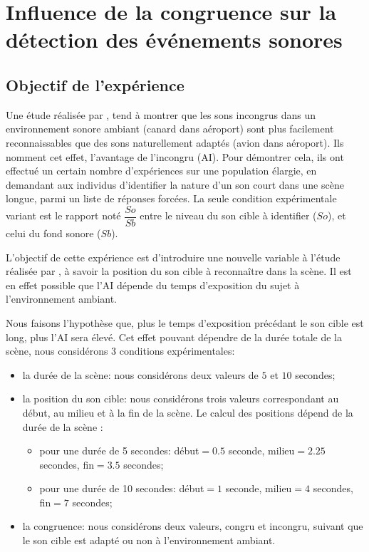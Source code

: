 \chapter[Expérience annexe: congruence]{Influence de la congruence sur la détection des événements sonores}
\label{app:xp_congruence}


\section{Objectif de l'expérience}

Une étude réalisée par \citep{gygi2011incongruency}, tend à montrer que les sons incongrus dans un environnement sonore ambiant (canard dans aéroport) sont plus facilement reconnaissables que des sons naturellement adaptés (avion dans aéroport). Ils nomment cet effet, l'avantage de l'incongru (AI). Pour démontrer cela, ils ont effectué un certain nombre d’expériences sur une population élargie, en demandant aux individus d’identifier la nature d’un son court dans une scène longue, parmi un liste de réponses forcées. La seule condition expérimentale variant est le rapport noté $\dfrac{So}{Sb}$ entre le niveau du son cible à identifier ($So$), et celui du fond sonore ($Sb$).

L'objectif de cette expérience est d'introduire une nouvelle variable à l'étude réalisée par \citep{gygi2011incongruency}, à savoir la position du son cible à reconnaître dans la scène. Il est en effet possible que l'AI dépende du temps d'exposition du sujet à l'environnement ambiant. 

Nous faisons l'hypothèse que, plus le temps d'exposition précédant le son cible est long, plus l'AI sera élevé. Cet effet pouvant dépendre de la durée totale de la scène, nous considérons 3 conditions expérimentales:

\begin{itemize}
\item la durée de la scène: nous considérons deux valeurs de $5$ et $10$ secondes;
\item la position du son cible: nous considérons trois valeurs correspondant au début, au milieu et à la fin de la scène. Le calcul des positions dépend de la durée de la scène :

\begin{itemize}
\item pour une durée de 5 secondes: début$=0.5$ seconde, milieu$=2.25$ secondes, fin$=3.5$ secondes;
\item pour une durée de 10 secondes: début$=1$ seconde, milieu$=4$ secondes, fin$=7$ secondes;
\end{itemize}

\item la congruence: nous considérons deux valeurs, congru et incongru, suivant que le son cible est adapté ou non à l'environnement ambiant.
\end{itemize}

